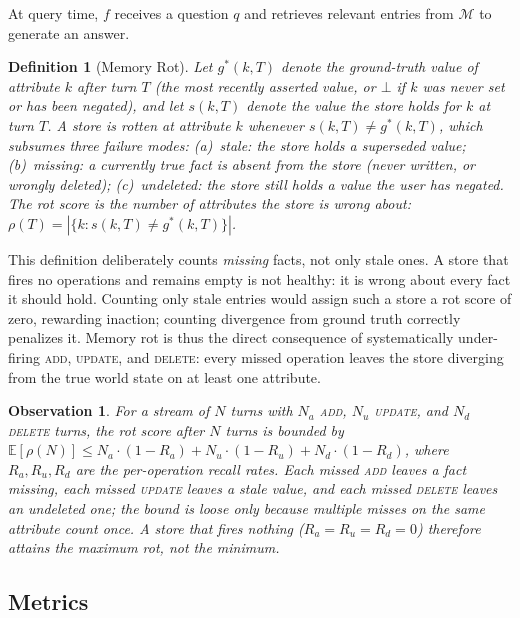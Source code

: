 \documentclass[10pt, twocolumn]{article}
\newtheorem{definition}{Definition}
\newtheorem{observation}{Observation}
\begin{document}
At query time, $f$ receives a question $q$ and retrieves relevant entries
from $\mathcal{M}$ to generate an answer.

\begin{definition}[Memory Rot]
Let $g^*(k, T)$ denote the ground-truth value of attribute $k$ after turn
$T$ (the most recently asserted value, or $\bot$ if $k$ was never set or has
been negated), and let $s(k, T)$ denote the value the store holds for $k$ at
turn $T$.
A store is \emph{rotten} at attribute $k$ whenever $s(k, T) \neq g^*(k, T)$,
which subsumes three failure modes:
(a)~\emph{stale}: the store holds a superseded value;
(b)~\emph{missing}: a currently true fact is absent from the store (never
written, or wrongly deleted);
(c)~\emph{undeleted}: the store still holds a value the user has negated.
The \emph{rot score} is the number of attributes the store is wrong about:
$\rho(T) = |\{k : s(k, T) \neq g^*(k, T)\}|$.
\end{definition}

This definition deliberately counts \emph{missing} facts, not only stale
ones. A store that fires no operations and remains empty is not healthy: it
is wrong about every fact it should hold. Counting only stale entries would
assign such a store a rot score of zero, rewarding inaction; counting
divergence from ground truth correctly penalizes it.
Memory rot is thus the direct consequence of systematically under-firing
\textsc{add}, \textsc{update}, and \textsc{delete}: every missed operation
leaves the store diverging from the true world state on at least one
attribute.

\begin{observation}
For a stream of $N$ turns with $N_a$ \textsc{add}, $N_u$ \textsc{update},
and $N_d$ \textsc{delete} turns, the rot score after $N$ turns is bounded by
$\mathbb{E}[\rho(N)] \leq N_a \cdot (1 - R_a) + N_u \cdot (1 - R_u)
+ N_d \cdot (1 - R_d)$,
where $R_a, R_u, R_d$ are the per-operation recall rates.
Each missed \textsc{add} leaves a fact missing, each missed \textsc{update}
leaves a stale value, and each missed \textsc{delete} leaves an undeleted
one; the bound is loose only because multiple misses on the same attribute
count once.
A store that fires nothing ($R_a = R_u = R_d = 0$) therefore attains the
maximum rot, not the minimum.
\end{observation}

\subsection{Metrics}
\end{document}
